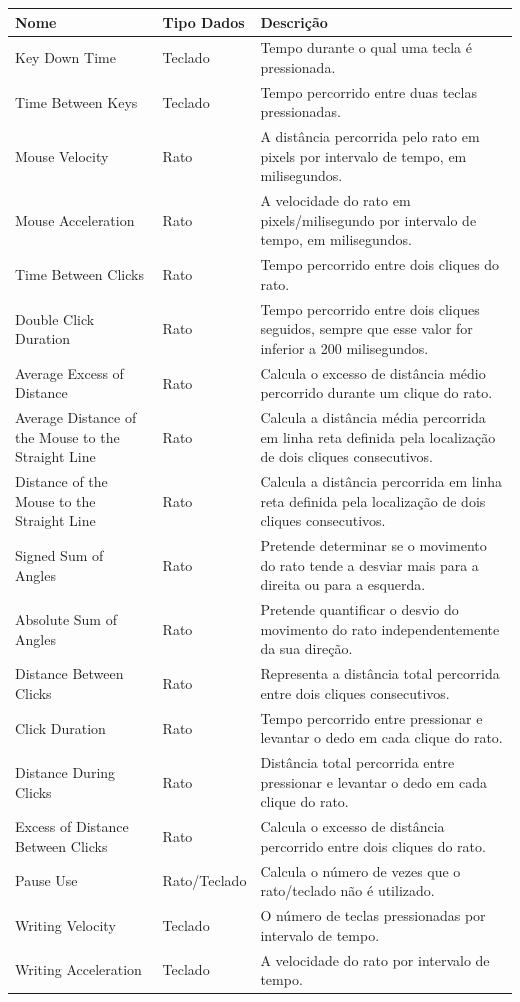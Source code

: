 \begin{center}
    \begin{longtable}{ | p{4cm} | l | p{7cm} |}
    \hline
    Nome & Tipo Dados & Descrição \\ \hline
    Key Down Time & Teclado & Tempo durante o qual uma tecla é pressionada. \\ \hline    		    Time Between Keys & Teclado & Tempo percorrido entre duas teclas pressionadas. \\ \hline
    Mouse Velocity & Rato & A distância percorrida pelo rato em pixels por intervalo de tempo, em milisegundos. \\ \hline
    Mouse Acceleration & Rato & A velocidade do rato em pixels/milisegundo por intervalo de tempo, em milisegundos. \\ \hline
    Time Between Clicks & Rato & Tempo percorrido entre dois cliques do rato. \\ \hline
    Double Click Duration & Rato & Tempo percorrido entre dois cliques seguidos, sempre que esse valor for inferior a 200 milisegundos. \\ \hline
    Average Excess of Distance & Rato & Calcula o excesso de distância médio percorrido durante um clique do rato. \\ \hline
    Average Distance of the Mouse to the Straight Line & Rato & Calcula a distância média percorrida em linha reta definida pela localização de dois cliques consecutivos. \\ \hline
    Distance of the Mouse to the Straight Line & Rato & Calcula a distância percorrida em linha reta definida pela localização de dois cliques consecutivos. \\ \hline
    Signed Sum of Angles & Rato & Pretende determinar se o movimento do rato tende a desviar mais para a direita ou para a esquerda. \\ \hline
    Absolute Sum of Angles & Rato & Pretende quantificar o desvio do movimento do rato independentemente da sua direção. \\ \hline
    Distance Between Clicks & Rato & Representa a distância total percorrida entre dois cliques consecutivos. \\ \hline
    Click Duration & Rato  & Tempo percorrido entre pressionar e levantar o dedo em cada clique do rato. \\ \hline
   Distance During Clicks &  Rato &  Distância total percorrida entre pressionar e levantar o dedo em cada clique do rato.\\ \hline
   Excess of Distance Between Clicks & Rato  & Calcula o excesso de distância percorrido entre dois cliques do rato. \\ \hline
   Pause Use & Rato/Teclado  & Calcula o número de vezes que o rato/teclado não é utilizado. \\ \hline
   Writing Velocity & Teclado  & O número de teclas pressionadas por intervalo de tempo. \\ \hline
   Writing Acceleration & Teclado  & A velocidade do rato por intervalo de tempo. \\ \hline
    \end{longtable}
\end{center}

